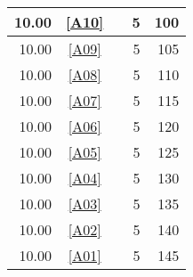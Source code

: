 \begin{longtable}{|r|c|p{7cm}||r|r|}
10.00 & \ref{A10} & \nameref{A10} & 5 & 100 \\ \hline
10.00 & \ref{A09} & \nameref{A09} & 5 & 105 \\ \hline
10.00 & \ref{A08} & \nameref{A08} & 5 & 110 \\ \hline
10.00 & \ref{A07} & \nameref{A07} & 5 & 115 \\ \hline
10.00 & \ref{A06} & \nameref{A06} & 5 & 120 \\ \hline
10.00 & \ref{A05} & \nameref{A05} & 5 & 125 \\ \hline
10.00 & \ref{A04} & \nameref{A04} & 5 & 130 \\ \hline
10.00 & \ref{A03} & \nameref{A03} & 5 & 135 \\ \hline
10.00 & \ref{A02} & \nameref{A02} & 5 & 140 \\ \hline
10.00 & \ref{A01} & \nameref{A01} & 5 & 145 \\ \hline
\end{longtable}